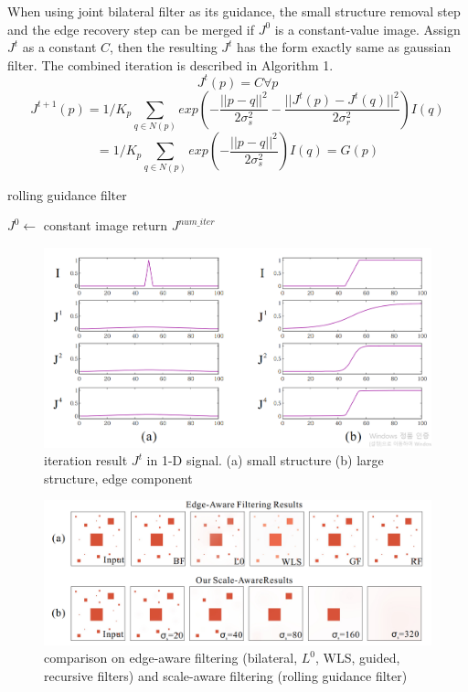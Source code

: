 \documentclass[extendedabs]{bmvc2k}
\begin{document}
When using joint bilateral filter as its guidance, the small structure removal
step and the edge recovery step can be merged if $J^0$ is a constant-value image. 
Assign $J^t$ as a constant $C$, then the resulting $J^t$ has the form exactly 
same as gaussian filter. The combined iteration is described in Algorithm 1.
\[J^t(p) = C \forall p\]
\[J^{t+1}(p) = 1/K_p\sum_{q \in N(p)}exp(-\frac{||p-q||^2}{2\sigma_s^2}-\frac{||J^t(p)-J^t(q)||^2}{2\sigma_r^2})I(q)\]
\[= 1/K_p\sum_{q \in N(p)}exp(-\frac{||p-q||^2}{2\sigma_s^2})I(q) = G(p)\]

\begin{algorithm}
    \caption{rolling guidance filter}
    $J^0 \gets$ constant image\;
    return $J^{num\_iter}$\;
\end{algorithm}

\begin{figure}[h]
    \centering
    \includegraphics[width=\linewidth]{hw2_1_2}
    \caption{iteration result $J^t$ in 1-D signal. (a) small structure 
    (b) large structure, edge component}
    \label{fig:2}
\end{figure}

\begin{figure}[h]
    \centering
    \includegraphics[width=\linewidth]{hw2_1_8}
    \caption{comparison on edge-aware filtering (bilateral, $L^0$, WLS, guided, recursive filters) 
    and scale-aware filtering (rolling guidance filter)}
    \label{fig:8}
\end{figure}
\end{document}
